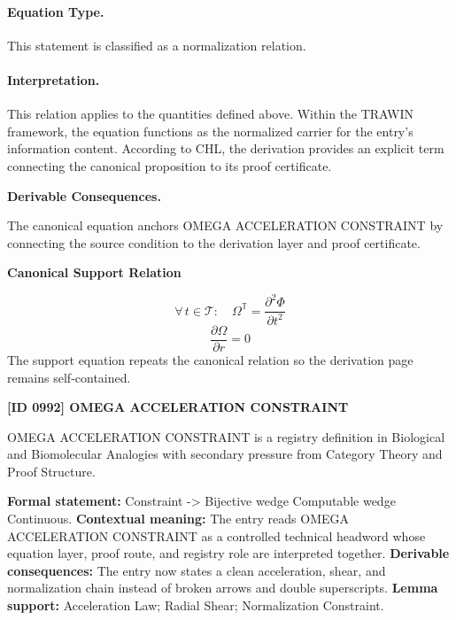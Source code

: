 \paragraph{Equation Type.}
This statement is classified as a normalization relation.

\paragraph{Interpretation.}
This relation applies to the quantities defined above. Within the TRAWIN framework, the equation functions as the normalized carrier for the entry’s information content. According to CHL, the derivation provides an explicit term connecting the canonical proposition to its proof certificate.

\par\vspace{0.35em}
\noindent\textbf{Derivable Consequences.}\quad
\begingroup
\footnotesize
\raggedright
The canonical equation anchors OMEGA ACCELERATION CONSTRAINT by connecting the source condition to the derivation layer and proof certificate.
\par\endgroup

\noindent\textbf{Canonical Support Relation}\par
\[
\forall\,t\in\mathcal{T}:\quad \Omega^{\mathbb{T}}=\frac{\partial^{2}\Phi}{\partial t^{2}}
\]
\[
\frac{\partial\Omega}{\partial r}=0
\]
\noindent The support equation repeats the canonical relation so the derivation page remains self-contained.\par

\clearpage
\noindent\textbf{[ID 0992] OMEGA ACCELERATION CONSTRAINT}\par
\vspace{0.35em}
\begingroup\small
{}
OMEGA ACCELERATION CONSTRAINT is a registry definition in Biological and Biomolecular Analogies with secondary pressure from Category Theory and Proof Structure.

\begingroup\footnotesize\setlength{\emergencystretch}{3em}\sloppy
\textbf{Formal statement:} Constraint -> Bijective wedge Computable wedge Continuous. \textbf{Contextual meaning:} The entry reads OMEGA ACCELERATION CONSTRAINT as a controlled technical headword whose equation layer, proof route, and registry role are interpreted together. \textbf{Derivable consequences:} The entry now states a clean acceleration, shear, and normalization chain instead of broken arrows and double superscripts. \textbf{Lemma support:} Acceleration Law; Radial Shear; Normalization Constraint.\par
\endgroup

